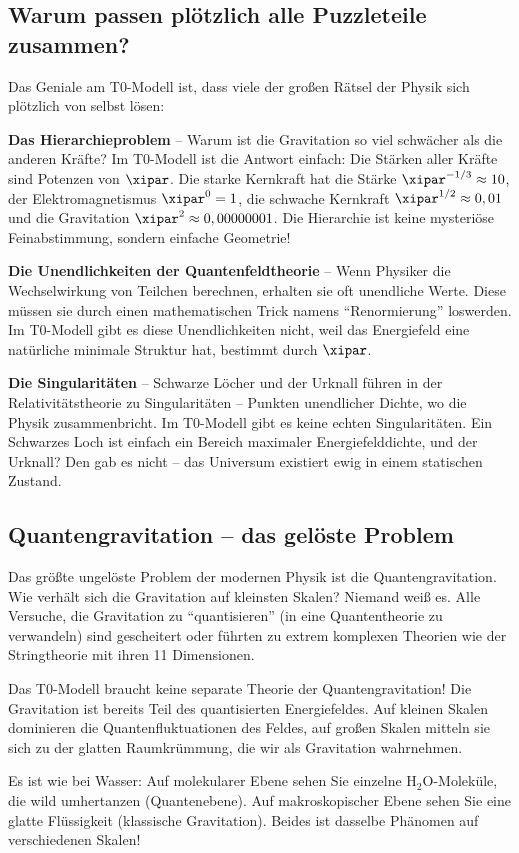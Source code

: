 	\subsection{Warum passen plötzlich alle Puzzleteile zusammen?}
	
	Das Geniale am T0-Modell ist, dass viele der großen Rätsel der Physik sich plötzlich von selbst lösen:
	
	\textbf{Das Hierarchieproblem} -- Warum ist die Gravitation so viel schwächer als die anderen Kräfte? Im T0-Modell ist die Antwort einfach: Die Stärken aller Kräfte sind Potenzen von $\xipar$. Die starke Kernkraft hat die Stärke $\xipar^{-1/3} \approx 10$, der Elektromagnetismus $\xipar^0 = 1$, die schwache Kernkraft $\xipar^{1/2} \approx 0,01$ und die Gravitation $\xipar^2 \approx 0,00000001$. Die Hierarchie ist keine mysteriöse Feinabstimmung, sondern einfache Geometrie!
	
	\textbf{Die Unendlichkeiten der Quantenfeldtheorie} -- Wenn Physiker die Wechselwirkung von Teilchen berechnen, erhalten sie oft unendliche Werte. Diese müssen sie durch einen mathematischen Trick namens ``Renormierung'' loswerden. Im T0-Modell gibt es diese Unendlichkeiten nicht, weil das Energiefeld eine natürliche minimale Struktur hat, bestimmt durch $\xipar$.
	
	\textbf{Die Singularitäten} -- Schwarze Löcher und der Urknall führen in der Relativitätstheorie zu Singularitäten -- Punkten unendlicher Dichte, wo die Physik zusammenbricht. Im T0-Modell gibt es keine echten Singularitäten. Ein Schwarzes Loch ist einfach ein Bereich maximaler Energiefelddichte, und der Urknall? Den gab es nicht -- das Universum existiert ewig in einem statischen Zustand.
	
	\subsection{Quantengravitation -- das gelöste Problem}
	
	Das größte ungelöste Problem der modernen Physik ist die Quantengravitation. Wie verhält sich die Gravitation auf kleinsten Skalen? Niemand weiß es. Alle Versuche, die Gravitation zu ``quantisieren'' (in eine Quantentheorie zu verwandeln) sind gescheitert oder führten zu extrem komplexen Theorien wie der Stringtheorie mit ihren 11 Dimensionen.
	
	\begin{important}
		Das T0-Modell braucht keine separate Theorie der Quantengravitation! Die Gravitation ist bereits Teil des quantisierten Energiefeldes. Auf kleinen Skalen dominieren die Quantenfluktuationen des Feldes, auf großen Skalen mitteln sie sich zu der glatten Raumkrümmung, die wir als Gravitation wahrnehmen.
		
		Es ist wie bei Wasser: Auf molekularer Ebene sehen Sie einzelne H$_2$O-Moleküle, die wild umhertanzen (Quantenebene). Auf makroskopischer Ebene sehen Sie eine glatte Flüssigkeit (klassische Gravitation). Beides ist dasselbe Phänomen auf verschiedenen Skalen!
	\end{important}
	
